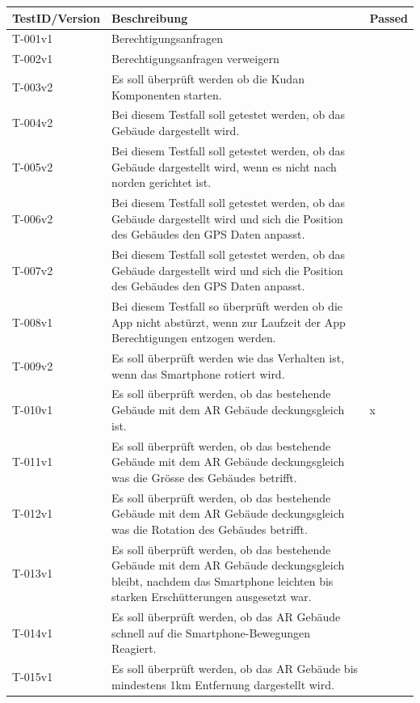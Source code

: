 \documentclass[a4paper]{scrreprt}
\begin{document}
\begin{tabularx}{\textwidth}{|l|X|l|}
\hline
	\textbf{TestID/Version }& \textbf{Beschreibung} & \textbf{Passed} \\
\hline
	T-001v1 & Berechtigungsanfragen & \checkmark \\
\hline
	T-002v1 & Berechtigungsanfragen verweigern & \checkmark \\
\hline
	T-003v2 & Es soll überprüft werden ob die Kudan Komponenten starten. & \checkmark \\
\hline
	T-004v2 & Bei diesem Testfall soll getestet werden, ob das Gebäude dargestellt wird. & \checkmark \\
\hline
	T-005v2 & Bei diesem Testfall soll getestet werden, ob das Gebäude dargestellt wird, wenn es nicht nach norden gerichtet ist. & \checkmark \\
\hline
	T-006v2 & Bei diesem Testfall soll getestet werden, ob das Gebäude dargestellt wird und sich die Position des Gebäudes den GPS Daten anpasst. & \checkmark \\
\hline
	T-007v2 & Bei diesem Testfall soll getestet werden, ob das Gebäude dargestellt wird und sich die Position des Gebäudes den GPS Daten anpasst. & \checkmark \\
\hline
	T-008v1 & Bei diesem Testfall so überprüft werden ob die App nicht abstürzt, wenn zur Laufzeit der App Berechtigungen entzogen werden. & \checkmark \\
\hline
	T-009v2 & Es soll überprüft werden wie das Verhalten ist, wenn das Smartphone rotiert wird. & \checkmark \\
\hline
	T-010v1 & Es soll überprüft werden, ob das bestehende Gebäude mit dem AR Gebäude deckungsgleich ist. & x \\
\hline
	T-011v1 & Es soll überprüft werden, ob das bestehende Gebäude mit dem AR Gebäude deckungsgleich was die Grösse des Gebäudes betrifft. & \checkmark \\
\hline
	T-012v1 & Es soll überprüft werden, ob das bestehende Gebäude mit dem AR Gebäude deckungsgleich was die Rotation des Gebäudes betrifft. & \checkmark \\
\hline
	T-013v1 & Es soll überprüft werden, ob das bestehende Gebäude mit dem AR Gebäude deckungsgleich bleibt, nachdem das Smartphone leichten bis starken Erschütterungen ausgesetzt war. & \checkmark \\
\hline
	T-014v1 & Es soll überprüft werden, ob das AR Gebäude schnell auf die Smartphone-Bewegungen Reagiert. & \checkmark \\
\hline
	T-015v1 & Es soll überprüft werden, ob das AR Gebäude bis mindestens 1km Entfernung dargestellt wird. & \checkmark \\
\hline
\end{tabularx}
\end{document}
